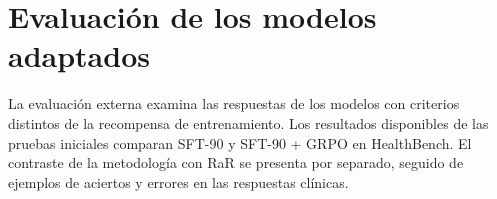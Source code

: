 \chapter{Evaluación de los modelos adaptados}
\label{ch:resultados-adaptacion}
La evaluación externa examina las respuestas de los modelos con criterios distintos de la recompensa de entrenamiento. Los resultados disponibles de las pruebas iniciales comparan SFT-90 y SFT-90 + GRPO en HealthBench. El contraste de la metodología con RaR se presenta por separado, seguido de ejemplos de aciertos y errores en las respuestas clínicas.




